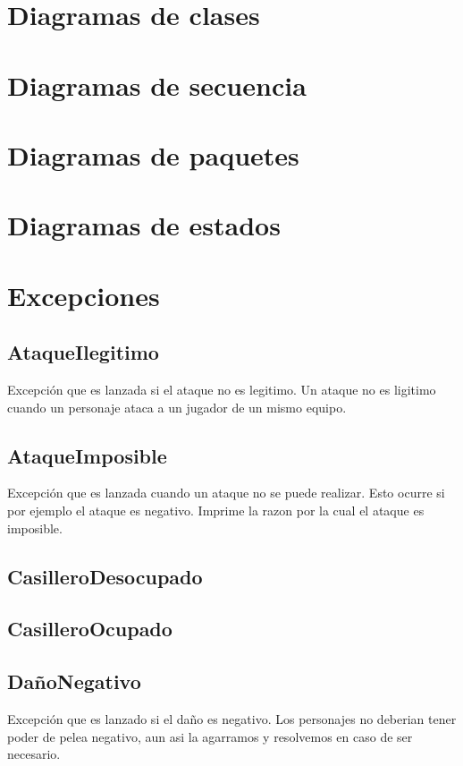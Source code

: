 \documentclass[a4paper]{article}
\begin{document}
\newpage
\section{Diagramas de clases}

\newpage
\section{Diagramas de secuencia}

\newpage
\section{Diagramas de paquetes}
	
\newpage
\section{Diagramas de estados}

\newpage
\section{Excepciones}


\subsection{AtaqueIlegitimo}
 Excepción que es lanzada si el ataque no es legitimo. Un ataque no es ligitimo cuando un personaje ataca a un jugador de un mismo equipo.

\subsection{AtaqueImposible}
 Excepción que es lanzada cuando un ataque no se puede realizar. Esto ocurre si por ejemplo el ataque es negativo. Imprime la razon por la cual el ataque es imposible.

\subsection{CasilleroDesocupado}

\subsection{CasilleroOcupado}

\subsection{DañoNegativo}
Excepción que es lanzado si el daño es negativo. Los personajes no deberian tener poder de pelea negativo, aun asi la agarramos y resolvemos en caso de ser necesario.
\end{document}
